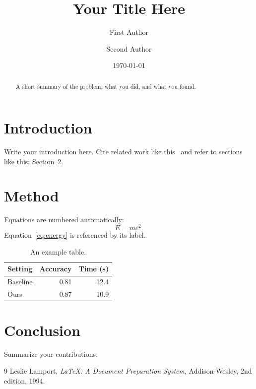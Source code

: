 \documentclass[11pt]{article}
\title{Your Title Here}
\author{First Author \and Second Author}
\date{\today}
\begin{document}
\maketitle

\begin{abstract}
A short summary of the problem, what you did, and what you found.
\end{abstract}

\section{Introduction}
\label{sec:intro}
Write your introduction here. Cite related work like this~\cite{lamport94}
and refer to sections like this: Section~\ref{sec:method}.

\section{Method}
\label{sec:method}
Equations are numbered automatically:
\begin{equation}
  \label{eq:energy}
  E = mc^2 .
\end{equation}
Equation~\eqref{eq:energy} is referenced by its label.

\begin{table}[h]
  \centering
  \begin{tabular}{lrr}
    \toprule
    Setting & Accuracy & Time (s) \\
    \midrule
    Baseline & 0.81 & 12.4 \\
    Ours     & 0.87 & 10.9 \\
    \bottomrule
  \end{tabular}
  \caption{An example table.}
  \label{tab:results}
\end{table}

\section{Conclusion}
Summarize your contributions.

\begin{thebibliography}{9}
  Leslie Lamport,
  \emph{\LaTeX: A Document Preparation System},
  Addison-Wesley, 2nd edition, 1994.
\end{thebibliography}
\end{document}
